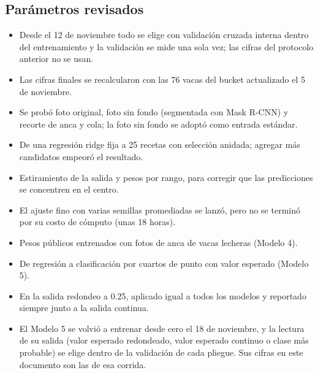 \subsection{Parámetros revisados}

\begin{itemize}
  \item Desde el 12 de noviembre todo se elige con validación cruzada interna dentro del entrenamiento y la validación se mide una sola vez; las cifras del protocolo anterior no se usan.
  \item Las cifras finales se recalcularon con las 76 vacas del bucket actualizado el 5 de noviembre.
  \item Se probó foto original, foto sin fondo (segmentada con Mask R-CNN) y recorte de anca y cola; la foto sin fondo se adoptó como entrada estándar.
  \item De una regresión ridge fija a 25 recetas con selección anidada; agregar más candidatos empeoró el resultado.
  \item Estiramiento de la salida y pesos por rango, para corregir que las predicciones se concentren en el centro.
  \item El ajuste fino con varias semillas promediadas se lanzó, pero no se terminó por su costo de cómputo (unas 18 horas).
  \item Pesos públicos entrenados con fotos de anca de vacas lecheras (Modelo 4).
  \item De regresión a clasificación por cuartos de punto con valor esperado (Modelo 5).
  \item En la salida redondeo a 0.25, aplicado igual a todos los modelos y reportado siempre junto a la salida continua.
  \item El Modelo 5 se volvió a entrenar desde cero el 18 de noviembre, y la lectura de su salida (valor esperado redondeado, valor esperado continuo o clase más probable) se elige dentro de la validación de cada pliegue. Sus cifras en este documento son las de esa corrida.
\end{itemize}
